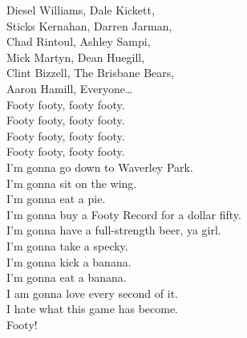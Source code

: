 Diesel Williams, Dale Kickett, \\
Sticks Kernahan, Darren Jarman, \\
Chad Rintoul, Ashley Sampi, \\
Mick Martyn, Dean Huegill, \\
Clint Bizzell, The Brisbane Bears, \\
Aaron Hamill, Everyone… \\

Footy footy, footy footy. \\
Footy footy, footy footy. \\
Footy footy, footy footy. \\
Footy footy, footy footy. \\

I'm gonna go down to Waverley Park. \\
I'm gonna sit on the wing. \\
I'm gonna eat a pie. \\
I'm gonna buy a Footy Record for a dollar fifty. \\
I'm gonna have a full-strength beer, ya girl. \\
I'm gonna take a specky. \\
I'm gonna kick a banana. \\
I'm gonna eat a banana. \\
I am gonna love every second of it. \\
I hate what this game has become. \\

Footy! \\

